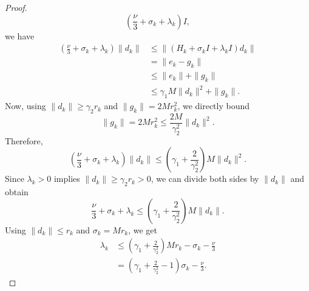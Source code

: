 \begin{itemize}
{\begin{proof}
\[                      \left(
                      \frac{\nu}{3}+\sigma_k+\lambda_k
                      \right)I,
                  \]
                  we have
                  \begin{align*}
                      \left(
                      \frac{\nu}{3}+\sigma_k+\lambda_k
                      \right)\|d_k\|
                       & \le
                      \|(H_k+\sigma_k I+\lambda_k I)d_k\| \\
                       & =
                      \|e_k-g_k\|                         \\
                       & \le
                      \|e_k\|+\|g_k\|                     \\
                       & \le
                      \gamma_1M\|d_k\|^2+\|g_k\|.
                  \end{align*}
                  Now, using \(\|d_k\|\ge \gamma_2 r_k\) and \(\|g_k\|=2Mr_k^2\), we directly bound
                  \[
                      \|g_k\|
                      =
                      2Mr_k^2
                      \le
                      \frac{2M}{\gamma_2^2}\|d_k\|^2.
                  \]
                  Therefore,
                  \[
                      \left(
                      \frac{\nu}{3}+\sigma_k+\lambda_k
                      \right)\|d_k\|
                      \le
                      \left(
                      \gamma_1+\frac{2}{\gamma_2^2}
                      \right)M\|d_k\|^2.
                  \]
                  Since \(\lambda_k>0\) implies \(\|d_k\|\ge \gamma_2 r_k>0\), we can divide both sides by \(\|d_k\|\) and obtain
                  \[
                      \frac{\nu}{3}+\sigma_k+\lambda_k
                      \le
                      \left(
                      \gamma_1+\frac{2}{\gamma_2^2}
                      \right)M\|d_k\|.
                  \]
                  Using \(\|d_k\|\le r_k\) and \(\sigma_k=Mr_k\), we get
                  \begin{align*}
                      \lambda_k
                       & \le
                      \left(
                      \gamma_1+\frac{2}{\gamma_2^2}
                      \right)Mr_k
                      -\sigma_k
                      -\frac{\nu}{3} \\
                       & =
                      \left(
                      \gamma_1+\frac{2}{\gamma_2^2}-1
                      \right)\sigma_k
                      -\frac{\nu}{3}.
                  \end{align*}

\end{proof}}
\end{itemize}
